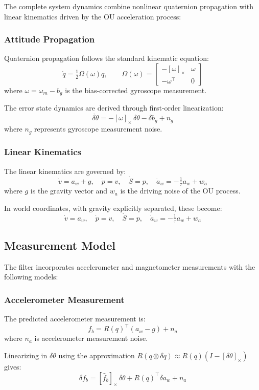 \documentclass[11pt,letterpaper]{article}
\begin{document}
The complete system dynamics combine nonlinear quaternion propagation with linear kinematics driven by the OU acceleration process:

\subsubsection{Attitude Propagation}

Quaternion propagation follows the standard kinematic equation:
\[
\dot q = \tfrac{1}{2}\Omega(\omega) q,\qquad
\Omega(\omega)=\begin{bmatrix}
-[\omega]_\times & \omega \\ -\omega^\top & 0
\end{bmatrix}
\]
where $\omega = \omega_m - b_g$ is the bias-corrected gyroscope measurement.

The error state dynamics are derived through first-order linearization:
\[
\dot{\delta\theta} = -[\omega]_\times\,\delta\theta - \delta b_g + n_g
\]
where $n_g$ represents gyroscope measurement noise.

\subsubsection{Linear Kinematics}

The linear kinematics are governed by:
\[
\dot v = a_w + g,\quad \dot p = v,\quad \dot S = p,\quad
\dot a_w = -\tfrac{1}{\tau} a_w + w_a
\]
where $g$ is the gravity vector and $w_a$ is the driving noise of the OU process.

In world coordinates, with gravity explicitly separated, these become:
\[
\dot v = a_w,\quad \dot p = v,\quad \dot S = p,\quad
\dot a_w = -\tfrac{1}{\tau} a_w + w_a
\]

\subsection{Measurement Model}

The filter incorporates accelerometer and magnetometer measurements with the following models:

\subsubsection{Accelerometer Measurement}

The predicted accelerometer measurement is:
\[
f_b = R(q)^\top(a_w - g) + n_a
\]
where $n_a$ is accelerometer measurement noise.

Linearizing in $\delta\theta$ using the approximation $R(q\!\otimes\!\delta q)\approx R(q)(I-[\delta\theta]_\times)$ gives:
\[
\delta f_b = [\hat f_b]_\times \,\delta\theta + R(q)^\top \delta a_w + n_a
\]
\end{document}
